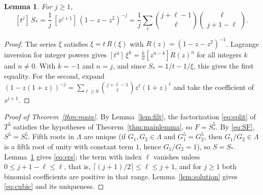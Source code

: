 \documentclass[11pt]{article}
\newtheorem{lemma}[theorem]{Lemma}
\theoremstyle{definition}
\theoremstyle{remark}
\numberwithin{equation}{section}
\newcommand{\Sst}{S_{*}}
\begin{document}
\begin{lemma}\label{lem:lagrange}
For $j\geq1$,
\[
  [t^j]\,\Sst=\frac1j\,[z^{j+1}]\,(1-z-z^2)^{-j}
  =\frac1j\sum_{\ell}\binom{j+\ell-1}{\ell}\binom{\ell}{j+1-\ell}.
\]
\end{lemma}

\begin{proof}
The series $\xi$ satisfies $\xi=t\,R(\xi)$ with $R(z)=(1-z-z^2)^{-1}$.
Lagrange inversion for integer powers \cite[Theorem~2.1.1 and
(2.2.1)]{Gessel} gives $[t^n]\,\xi^k=\frac kn[z^{n-k}]R(z)^n$ for all
integers $k$ and $n\neq0$. With $k=-1$ and $n=j$, and since
$\Sst=1/t-1/\xi$, this gives the first equality. For the second, expand
$(1-z(1+z))^{-j}=\sum_{\ell\geq0}\binom{j+\ell-1}{\ell}z^\ell(1+z)^\ell$
and take the coefficient of $z^{j+1}$.
\end{proof}



\begin{proof}[Proof of Theorem~\ref{thm:main}]
By Lemma~\ref{lem:filt}, the factorization \eqref{eq:split} of $T^5$
satisfies the hypotheses of Theorem~\ref{thm:mainlemma}, so $F=\Sst^5$.
By \eqref{eq:SF}, $S^5=\Sst^5$. Fifth roots in $\Lambda$ are unique (if
$G_1,G_2\in\Lambda$ and $G_1^5=G_2^5$, then $G_1/G_2\in\Lambda$ is a fifth root of
unity with constant term $1$, hence $G_1/G_2=1$), so $S=\Sst$.
Lemma~\ref{lem:lagrange} gives \eqref{eq:ers}; the term with index $\ell$
vanishes unless $0\leq j+1-\ell\leq\ell$, that is,
$\lceil(j+1)/2\rceil\leq\ell\leq j+1$, and for $j\geq1$ both binomial
coefficients are positive in that range. Lemma~\ref{lem:solution} gives
\eqref{eq:cubic} and its uniqueness.
\end{proof}
\end{document}

